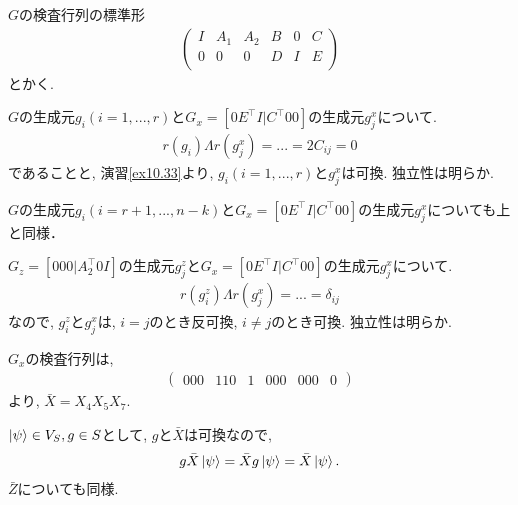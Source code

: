 \begin{ex}
    \label{ex10.54}
    $G$の検査行列の標準形
    \begin{align*}
        \begin{pmatrix}
            I & A_1 & A_2 & B & 0 & C \\
            0 & 0   & 0   & D & I & E \\
        \end{pmatrix}
    \end{align*}
    とかく.
    \par
    $G$の生成元$g_i (i = 1, ..., r)$と$G_x = [0 E^\top I | C^\top 0 0 ]$の生成元$g_j^x$について.
    \begin{align*}
        r(g_i) \Lambda r(g_j^x) = ... = 2 C_{ij} = 0
    \end{align*}
    であることと, 演習\ref{ex10.33}より, $g_i (i = 1, ..., r)$と$g_j^x$は可換. 独立性は明らか.
    \par
    $G$の生成元$g_i (i = r+1, ..., n-k)$と$G_x = [0 E^\top I | C^\top 0 0 ]$の生成元$g_j^x$についても上と同様．
    \par
    $G_z = [0 0 0 | A_2^\top 0 I ]$の生成元$g_j^z$と$G_x = [0 E^\top I | C^\top 0 0 ]$の生成元$g_j^x$について.
    \begin{align*}
        r(g_i^z) \Lambda r(g_j^x) = ... = \delta_{ij}
    \end{align*}
    なので, $g_i^z$と$g_j^x$は, $i=j$のとき反可換, $i \neq j$のとき可換. 独立性は明らか.
\end{ex}

\begin{ex}
    \label{ex10.55}
    $G_x$の検査行列は,
    \begin{align*}
        \left(
        \begin{array}{c|c|c|c|c|c}
            000 & 110 & 1 & 000 & 000 & 0
        \end{array}
        \right)
    \end{align*}
    より, $\bar{X} = X_4 X_5 X_7$.
\end{ex}

\begin{ex}
    \label{ex10.56}
    $\ket{\psi}\in V_S, g \in S$として, $g$と$\bar{X}$は可換なので,
    \begin{align*}
        g \bar{X} \ket{\psi} =  \bar{X} g  \ket{\psi} = \bar{X} \ket{\psi}.
    \end{align*}
    $\bar{Z}$についても同様.
\end{ex}

